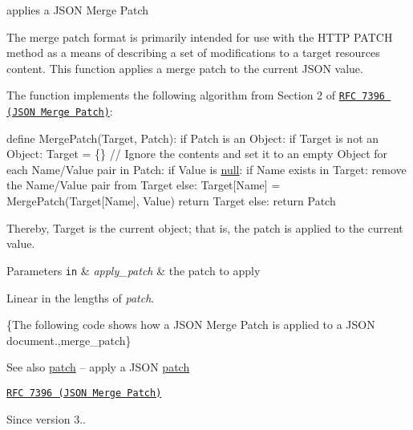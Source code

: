applies a J\+S\+ON Merge Patch 

The merge patch format is primarily intended for use with the H\+T\+TP P\+A\+T\+CH method as a means of describing a set of modifications to a target resource\textquotesingle{}s content. This function applies a merge patch to the current J\+S\+ON value.

The function implements the following algorithm from Section 2 of \href{https://tools.ietf.org/html/rfc7396}{\tt R\+FC 7396 (J\+S\+ON Merge Patch)}\+:


\begin{DoxyCode}
define MergePatch(Target, Patch):
  if Patch is an Object:
    if Target is not an Object:
      Target = \{\} \textcolor{comment}{// Ignore the contents and set it to an empty Object}
    \textcolor{keywordflow}{for each} Name/Value pair in Patch:
      \textcolor{keywordflow}{if} Value is \mbox{\hyperlink{namespacenlohmann_1_1detail_a1ed8fc6239da25abcaf681d30ace4985a37a6259cc0c1dae299a7866489dff0bd}{null}}:
        \textcolor{keywordflow}{if} Name exists in Target:
          \textcolor{keyword}{remove} the Name/Value pair from Target
      \textcolor{keywordflow}{else}:
        Target[Name] = MergePatch(Target[Name], Value)
    \textcolor{keywordflow}{return} Target
  \textcolor{keywordflow}{else}:
    \textcolor{keywordflow}{return} Patch
\end{DoxyCode}


Thereby, {\ttfamily Target} is the current object; that is, the patch is applied to the current value.


\begin{DoxyParams}[1]{Parameters}
\mbox{\tt in}  & {\em apply\+\_\+patch} & the patch to apply\\
\hline
\end{DoxyParams}
Linear in the lengths of {\itshape patch}.

\{The following code shows how a J\+S\+ON Merge Patch is applied to a J\+S\+ON document.,merge\+\_\+patch\}

\begin{DoxySeeAlso}{See also}
\mbox{\hyperlink{classnlohmann_1_1basic__json_a81e0c41a4a9dff4df2f6973f7f8b2a83}{patch}} -- apply a J\+S\+ON \mbox{\hyperlink{classnlohmann_1_1basic__json_a81e0c41a4a9dff4df2f6973f7f8b2a83}{patch}} 

\href{https://tools.ietf.org/html/rfc7396}{\tt R\+FC 7396 (J\+S\+ON Merge Patch)}
\end{DoxySeeAlso}
\begin{DoxySince}{Since}
version 3.. 
\end{DoxySince}
\mbox{\label{classnlohmann_1_1basic__json_a677318a34ade7f8177a2784c06aa3671}} 

